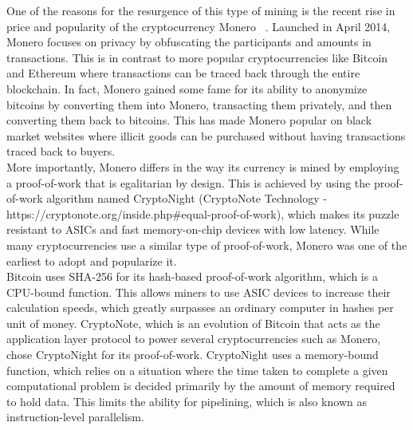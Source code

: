 One of the reasons for the resurgence of this type of mining is the recent rise in price and popularity of the cryptocurrency Monero ~\cite{monero}. Launched in April 2014, Monero focuses on privacy by obfuscating the participants and amounts in transactions. This is in contrast to more popular cryptocurrencies like Bitcoin and Ethereum where transactions can be traced back through the entire blockchain. In fact, Monero gained some fame for its ability to anonymize bitcoins by converting them into Monero, transacting them privately, and then converting them back to bitcoins. This has made Monero popular on black market websites where illicit goods can be purchased without having transactions traced back to buyers. 
\\
More importantly, Monero differs in the way its currency is mined by employing a proof-of-work that is egalitarian by design. This is achieved by using the proof-of-work algorithm named CryptoNight (CryptoNote Technology - https://cryptonote.org/inside.php#equal-proof-of-work), which makes its puzzle resistant to ASICs and fast memory-on-chip devices with low latency. While many cryptocurrencies use a similar type of proof-of-work, Monero was one of the earliest to adopt and popularize it. 
\\
Bitcoin uses SHA-256 for its hash-based proof-of-work algorithm, which is a CPU-bound function. This allows miners to use ASIC devices to increase their calculation speeds, which greatly surpasses an ordinary computer in hashes per unit of money. CryptoNote, which is an evolution of Bitcoin that acts as the application layer protocol to power several cryptocurrencies such as Monero, chose CryptoNight for its proof-of-work. CryptoNight uses a memory-bound function, which relies on a situation where the time taken to complete a given computational problem is decided primarily by the amount of memory required to hold data. This limits the ability for pipelining, which is also known as instruction-level parallelism.  
\\
